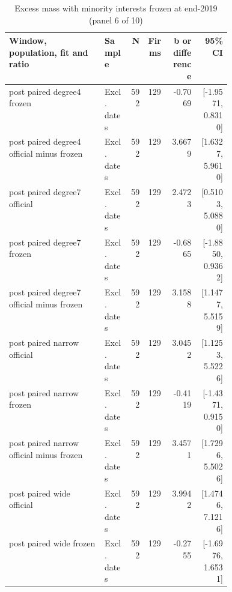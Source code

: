 \begin{table}[!htbp]\centering\scriptsize
\caption{Excess mass with minority interests frozen at end-2019 (panel 6 of 10)}
\begin{threeparttable}
\begin{tabular}{p{0.43\linewidth}lrrrr}
\toprule
Window, population, fit and ratio & Sample & N & Firms & b or difference & 95\% CI \\
\midrule
post paired degree4 frozen & Excl. dates & 592 & 129 & -0.7069 & [-1.9571, 0.8310] \\
post paired degree4 official minus frozen & Excl. dates & 592 & 129 & 3.6679 & [1.6327, 5.9610] \\
post paired degree7 official & Excl. dates & 592 & 129 & 2.4723 & [0.5103, 5.0880] \\
post paired degree7 frozen & Excl. dates & 592 & 129 & -0.6865 & [-1.8850, 0.9362] \\
post paired degree7 official minus frozen & Excl. dates & 592 & 129 & 3.1588 & [1.1477, 5.5159] \\
post paired narrow official & Excl. dates & 592 & 129 & 3.0452 & [1.1253, 5.5226] \\
post paired narrow frozen & Excl. dates & 592 & 129 & -0.4119 & [-1.4371, 0.9150] \\
post paired narrow official minus frozen & Excl. dates & 592 & 129 & 3.4571 & [1.7296, 5.5026] \\
post paired wide official & Excl. dates & 592 & 129 & 3.9942 & [1.4746, 7.1216] \\
post paired wide frozen & Excl. dates & 592 & 129 & -0.2755 & [-1.6976, 1.6531] \\
\bottomrule
\end{tabular}
\begin{tablenotes}[flushleft]\footnotesize

\end{tablenotes}
\end{threeparttable}
\end{table}
